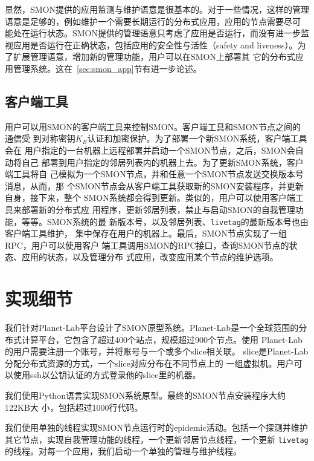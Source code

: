 %

显然，SMON提供的应用监测与维护语意是很基本的。对于一些情况，这样的管理
语意是足够的，例如维护一个需要长期运行的分布式应用，应用的节点需要尽可
能处在运行状态。SMON提供的管理语意只考虑了应用是否运行，而没有进一步监
视应用是否运行在正确状态，包括应用的安全性与活性（safety and
liveness）。为了扩展管理语意，增加新的管理功能，用户可以在SMON上部署其
它的分布式应用管理系统。这在~\ref{sec:smon_app}节有进一步论述。

\subsection{客户端工具}
\label{subsec:client}

用户可以用SMON的客户端工具来控制SMON。客户端工具和SMON节点之间的通信受
到对称密钥$K_E$认证和加密保护。为了部署一个新SMON系统，客户端工具会在
用户指定的一台机器上远程部署并启动一个SMON节点，之后，SMON会自动将自己
部署到用户指定的邻居列表内的机器上去。为了更新SMON系统，客户端工具将自
己模拟为一个SMON节点，并和任意一个SMON节点发送交换版本号消息，从而，那
个SMON节点会从客户端工具获取新的SMON安装程序，并更新自身，接下来，整个
SMON系统都会得到更新。类似的，用户可以使用客户端工具来部署新的分布式应
用程序，更新邻居列表，禁止与启动SMON的自我管理功能，等等。SMON系统的最
新版本号，以及邻居列表、\texttt{livetag}的最新版本号也由客户端工具维护，
集中保存在用户的机器上。最后，SMON节点实现了一组RPC，用户可以使用客户
端工具调用SMON的RPC接口，查询SMON节点的状态、应用的状态，以及管理分布
式应用，改变应用某个节点的维护选项。

\section{实现细节}
\label{sec:smon_impl}

我们针对Planet-Lab平台设计了SMON原型系统。Planet-Lab是一个全球范围的分
布式计算平台，它包含了超过400个站点，规模超过900个节点。使用
Planet-Lab的用户需要注册一个账号，并将账号与一个或多个slice相关联。
slice是Planet-Lab分配分布式资源的方式，一个slice对应分布在不同节点上的
一组虚拟机。用户可以使用ssh以公钥认证的方式登录他的slice里的机器。

我们使用Python语言实现SMON系统原型。最终的SMON节点安装程序大约122KB大
小，包括超过1000行代码。

我们使用单独的线程实现SMON节点运行时的epidemic活动。包括一个探测并维护
其它节点，实现自我管理功能的线程，一个更新邻居节点线程，一个更新
\texttt{livetag}的线程。对每一个应用，我们启动一个单独的管理与维护线程。

